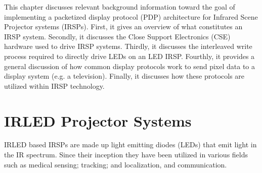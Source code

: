 \label{chap:background}

This chapter discusses relevant background information toward the goal of implementing a packetized display protocol (PDP) architecture for Infrared Scene Projector systems (IRSPs). First, it gives an overview of what constitutes an IRSP system. Secondly, it discusses the Close Support Electronics (CSE) hardware used to drive IRSP systems. Thirdly, it discusses the interleaved write process required to directly drive LEDs on an LED IRSP. Fourthly, it provides a general discussion of how common display protocols work to send pixel data to a display system (e.g. a television). Finally, it discusses how these protocols are utilized within IRSP technology.

\section{IRLED Projector Systems}
\label{sec:irled_projector_systems}
    IRLED based IRSPs are made up light emitting diodes (LEDs) that emit light in the IR spectrum\cite{biard1966semiconductor}. Since their inception they have been utilized in various fields such as medical sensing\cite{MonteiroEtAl2011,MEEKS1998433,Sadick2009,takhtfooladi2015effects,yamanishi1995respiration}; tracking; and localization\cite{PlotogVladescu2015,Kimon2001,SCHOLZ20151233,WalshDaemsSteckel2015,zeylikovich2003mid}, and communication\cite{CossuEtAl2014,escobosa2004ir,GeorgopoulosKormakopoulos1986,sohn2007localization,JangEtAl2012}.

